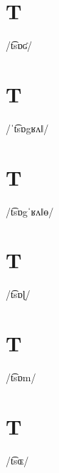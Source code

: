 \documentclass[10pt,a4paper,twoside]{book}
\begin{document}
\section*{T}

\begin{multicols}{3}
 {/t͡sɒʛ/} {}
\end{multicols}

\section*{T}

\begin{multicols}{3}
 {/ˈt͡sɒgʁʌǁ/} {}
\end{multicols}

\section*{T}

\begin{multicols}{3}
 {/t͡sɒgˈʁʌǁɵ/} {}
\end{multicols}

\section*{T}

\begin{multicols}{3}
 {/t͡sɒɭ/} {}
\end{multicols}

\section*{T}

\begin{multicols}{3}
 {/t͡sɒm/} {}
\end{multicols}

\section*{T}

\begin{multicols}{3}
 {/t͡sɶ/} {}
\end{multicols}
\end{document}
